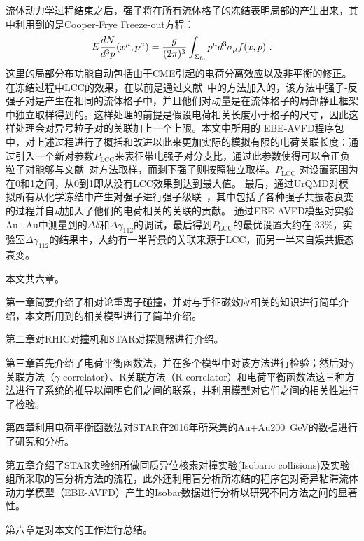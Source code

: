 流体动力学过程结束之后，强子将在所有流体格子的冻结表明局部的产生出来，其中利用到的是Cooper-Frye Freeze-out方程：
\begin{eqnarray}\label{eq_cooperfrye}
E \frac{dN}{d^3p} (x^\mu, p^\mu) = \frac{g}{(2\pi)^3} \int_{\Sigma_{\rm fo}} p^\mu d^3\sigma_\mu f(x,p) \,\, .
\end{eqnarray} 
这里的局部分布功能自动包括由于CME引起的电荷分离效应以及非平衡的修正。在冻结过程中LCC的效果，在以前是通过文献~\cite{Schenke:2019ruo}中的方法加入的，该方法中强子-反强子对是产生在相同的流体格子中，并且他们对动量是在流体格子的局部静止框架中独立取样得到的。这样处理的前提是假设电荷相关长度小于格子的尺寸，因此这样处理会对异号粒子对的关联加上一个上限。本文中所用的 EBE-AVFD程序包中，对上述过程进行了概括和改进以此来更加实际的模拟有限的电荷关联长度：通过引入一个新对参数$P_\text{LCC}$来表征带电强子对分支比，通过此参数使得可以令正负粒子对能够与文献~\cite{Schenke:2019ruo}对方法取样，而剩下强子则按照独立取样。$P_\text{LCC}$ 对设置范围为在0和1之间，从0到1即从没有LCC效果到达到最大值。
最后，通过UrQMD对模拟所有从化学冻结中产生对强子进行强子级联~\cite{Bleicher:1999xi}，其中包括了各种强子共振态衰变的过程并自动加入了他们的电荷相关的关联的贡献。
通过EBE-AVFD模型对实验Au+Au中测量到的$\Delta\delta$和$\Delta\gamma_{112}$的调试，最后得到$P_\text{LCC}$的最优设置大约在 $33\%$，实验室$\Delta\gamma_{112}$的结果中，大约有一半背景的关联来源于LCC，而另一半来自娱共振态衰变。


\bigskip

本文共六章。

第一章简要介绍了相对论重离子碰撞，并对与手征磁效应相关的知识进行简单介绍，本文所用到的相关模型进行了简单介绍。

第二章对RHIC对撞机和STAR对探测器进行介绍。

第三章首先介绍了电荷平衡函数法，并在多个模型中对该方法进行检验；然后对$\gamma$关联方法（$\gamma$ correlator）、R关联方法（R-correlator）和电荷平衡函数法这三种方法进行了系统的推导以阐明它们之间的联系，并利用模型对它们之间的相关性进行了检验。

第四章利用电荷平衡函数法对STAR在2016年所采集的Au+Au200~GeV的数据进行了研究和分析。

第五章介绍了STAR实验组所做同质异位核素对撞实验(Isobaric collisions)及实验组所采取的盲分析方法的流程，此外还利用盲分析所冻结的程序包对奇异粘滞流体动力学模型（EBE-AVFD）产生的Isobar数据进行分析以研究不同方法之间的显著性。

第六章是对本文的工作进行总结。







